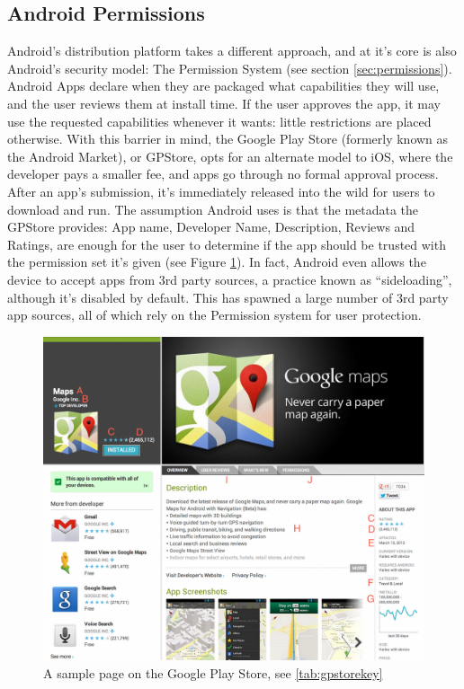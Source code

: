 \subsection{Android Permissions}
Android's distribution platform takes a different approach, and at it's core is also Android's security model: The Permission System (see section \ref{sec:permissions}). Android Apps declare when they are packaged what capabilities they will use, and the user reviews them at install time. If the user approves the app, it may use the requested capabilities whenever it wants: little restrictions are placed otherwise. With this barrier in mind, the Google Play Store (formerly known as the Android Market), or GPStore, opts for an alternate model to iOS, where the developer pays a smaller fee, and apps go through no formal approval process. After an app's submission, it's immediately released into the wild for users to download and run. The assumption Android uses is that the metadata the GPStore provides: App name, Developer Name, Description, Reviews and Ratings, are enough for the user to determine if the app should be trusted with the permission set it's given (see Figure \ref{fig:gpstoreapps}). In fact, Android even allows the device to accept apps from 3rd party sources, a practice known as ``sideloading'', although it's disabled by default. This has spawned a large number of 3rd party app sources, all of which rely on the Permission system for user protection.


\begin{figure}[h]
\begin{center}
\includegraphics[width=0.9\columnwidth]{figs/GPStoreAppPage}
\caption{A sample page on the Google Play Store, see \ref{tab:gpstorekey}}
\label{fig:gpstoreapps}
\end{center}
\end{figure}

